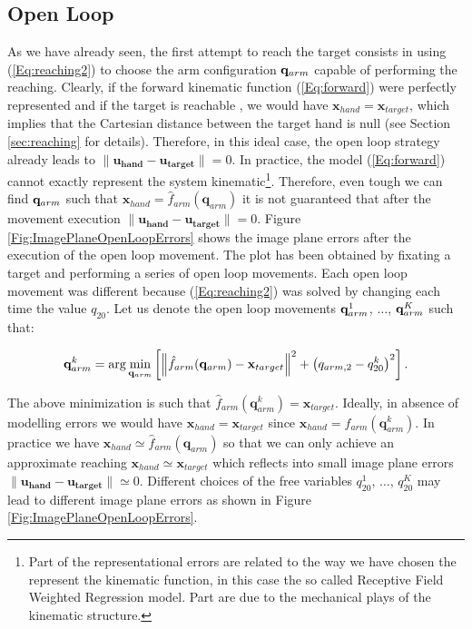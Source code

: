 \subsection{Open Loop}
As we have already seen, the first attempt to reach the target consists in using (\ref{Eq:reaching2})
to choose the arm configuration $\mathbf q_{arm}$ capable of performing the reaching. Clearly, if the forward 
kinematic function (\ref{Eq:forward}) were perfectly represented and if the target is reachable , we would have $\mathbf x_{hand} =  \mathbf x_{target}$, which implies that the Cartesian distance between the target hand
 is null (see Section \ref{sec:reaching} for details). Therefore, in this ideal case, the open loop 
 strategy already leads to $\| \mathbf {u_{hand}} - \mathbf {u_{target}}\| = 0$. In practice, the model 
 (\ref{Eq:forward}) cannot exactly represent the system kinematic\footnote{Part of the representational 
 errors are related to the way we have chosen the represent the kinematic function, in this case the
 so called Receptive Field Weighted Regression model. Part are due to the mechanical plays of the
 kinematic structure.}. Therefore, even tough we can find $\mathbf q_{arm}$ such that $\mathbf x_{hand}=
 \hat f_{arm}(\mathbf q_{arm})$ it is not guaranteed that after the movement execution 
 $\| \mathbf {u_{hand}} - \mathbf {u_{target}}\| = 0$. Figure \ref{Fig:ImagePlaneOpenLoopErrors}
 shows the image plane errors after the execution of the open loop movement. The plot has been obtained
 by fixating a target and performing a series of open loop movements. Each open loop
 movement was different because (\ref{Eq:reaching2}) was solved 
 by changing each time the value $q_{20}$. Let us denote the open loop movements $\mathbf q_{arm}^1$, $\dots$, 
 $\mathbf q_{arm}^K$ such that:
 
 \begin{eqnarray} \label{Eq:OpenLoopMovements}
 \mathbf q_{arm}^k = \arg \min_{\mathbf q_{arm}}
  \left[
  \left\| \hat f_{arm}(\mathbf q_{arm}) - \mathbf x_{target}\right\|^2 + \left(q_{arm,2}-q_{20}^k\right)^2
  \right].
 \end{eqnarray}
 
 The above minimization is such that $\hat f_{arm}(\mathbf q_{arm}^k) = \mathbf x_{target}$. Ideally, in absence
 of modelling errors we would have $ \mathbf x_{hand} = \mathbf x_{target}$ since $\mathbf x_{hand} = f_{arm}(\mathbf q_{arm}^k)$. In practice we have $\mathbf x_{hand} \simeq \hat f_{arm}(\mathbf q_{arm})$ 
 so that we can only achieve an approximate reaching $ \mathbf x_{hand} \simeq \mathbf x_{target}$ 
 which reflects into small image plane errors $\| \mathbf {u_{hand}} - \mathbf {u_{target}}\| \simeq 0$. Different choices 
 of the free variables $q_{20}^1$, $\dots$, $q_{20}^K$ may lead to different image plane errors as shown 
 in Figure \ref{Fig:ImagePlaneOpenLoopErrors}.



